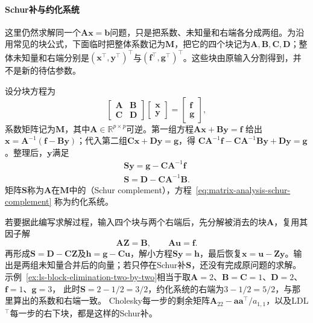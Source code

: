 \paragraph{Schur补与约化系统}

这里仍然求解同一个$\bm A\bm x=\bm b$问题，只是把系数、未知量和右端各分成两组。为沿用常见的块公式，下面临时把整体系数记为$\bm M$，把它的四个块记为$\bm A,\bm B,\bm C,\bm D$；整体未知量和右端分别是$(\bm x^\top,\bm y^\top)^\top$与$(\bm f^\top,\bm g^\top)^\top$。这些块由原输入分割得到，并不是新的待估参数。

设分块方程为
\[
 \begin{bmatrix}\bm A&\bm B\\\bm C&\bm D\end{bmatrix}
 \begin{bmatrix}\bm x\\\bm y\end{bmatrix}
 =\begin{bmatrix}\bm f\\\bm g\end{bmatrix},
\]
系数矩阵记为$\bm M$，其中$\bm A\in\mathbb R^{p\times p}$可逆。第一组方程$\bm A\bm x+\bm B\bm y=\bm f$
给出$\bm x=\bm A^{-1}(\bm f-\bm B\bm y)$；代入第二组$\bm C\bm x+\bm D\bm y=\bm g$，得
$\bm C\bm A^{-1}\bm f-\bm C\bm A^{-1}\bm B\bm y+\bm D\bm y=\bm g$。整理后，$\bm y$满足
\begin{equation}
\begin{gathered}
\bm S\bm y=\bm g-\bm C\bm A^{-1}\bm f\\
\bm S=\bm D-\bm C\bm A^{-1}\bm B.
\end{gathered}
\label{eq:matrix-analysis-schur-complement}
\end{equation}
矩阵$\bm S$称为$\bm A$在$\bm M$中的（Schur complement），方程~\eqref{eq:matrix-analysis-schur-complement}
称为约化系统。

若要据此编写求解过程，输入四个块与两个右端后，先分解被消去的块$\bm A$，复用其因子解
\[
 \bm A\bm Z=\bm B,\qquad \bm A\bm u=\bm f.
\]
再形成$\bm S=\bm D-\bm C\bm Z$及$\bm h=\bm g-\bm C\bm u$，解小方程$\bm S\bm y=\bm h$，最后恢复$\bm x=\bm u-\bm Z\bm y$。输出是两组未知量合并后的向量；若只停在Schur补$\bm S$，还没有完成原问题的求解。
\label{def:matrix-analysis-schur-complement}
示例~\ref{ex:ls-block-elimination-two-by-two}相当于取$\bm A=2$、$\bm B=\bm C=1$、$\bm D=2$、$\bm f=1$、$\bm g=3$，
此时$\bm S=2-1/2=3/2$，约化系统的右端为$3-1/2=5/2$，与那里算出的系数和右端一致。
Cholesky每一步的剩余矩阵$\bm A_{22}-\bm a\bm a^\top/a_{1,1}$，以及LDL$^{\top}$每一步的右下块，都是这样的Schur补。

